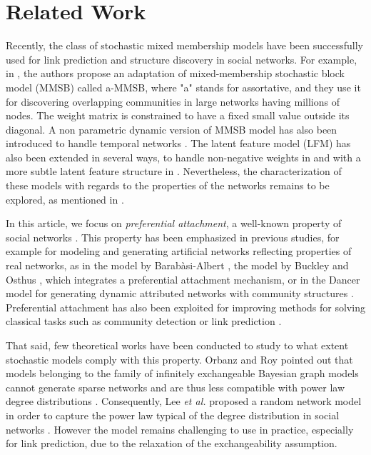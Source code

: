 
\section{Related Work}
\label{sec:rel-work}

Recently,  the class of stochastic mixed membership models have been successfully used for link prediction and structure discovery in social networks. For example, in \cite{AMMSB}, the authors  propose an adaptation of mixed-membership stochastic block model (MMSB) called a-MMSB, where "a" stands for assortative, and they use it for discovering overlapping communities in large networks having millions of nodes. The weight matrix is constrained to have a fixed small value outside its diagonal. A non parametric dynamic version of MMSB model has also been introduced to  handle temporal networks \cite{fan2015dynamic}. The latent feature model (LFM) has also been extended in several ways, to handle non-negative weights in \cite{IMRM} and with a more subtle latent feature structure in \cite{ILAM}. Nevertheless, the characterization of these models with regards to the properties of the networks remains to be explored, as mentioned in \cite{jacobs2014unified}.

In this article, we focus on \textit{preferential attachment}, a well-known property of social networks \cite{Newman2010, Barabasi2003}. This property has been emphasized in previous studies, for example for modeling and generating artificial networks reflecting properties of real networks, as in the model by Barab\`asi-Albert \cite{albert2002statistical}, the model by Buckley and Osthus \cite{Buckley2001}, which integrates a preferential attachment mechanism, or in the Dancer model for generating dynamic attributed networks with community structures \cite{Largeron2017}. Preferential attachment has also  been exploited for improving methods for solving classical tasks such as community detection \cite{Ciglan2013} or link prediction \cite{Zeng2016}.

That said, few theoretical works have been conducted to study to what extent stochastic models comply with this property. 
Orbanz and Roy  pointed out that models belonging to the family of infinitely exchangeable Bayesian graph models cannot generate sparse networks and are thus less compatible with power law degree distributions \cite{orbanz2015bayesian}. Consequently, Lee \textit{et al.}  proposed a random network model in order to capture the power law typical of the degree distribution in social networks \cite{Lee2015}. However the model remains challenging to use in practice, especially for link prediction, due to the relaxation of the exchangeability assumption.~\\

